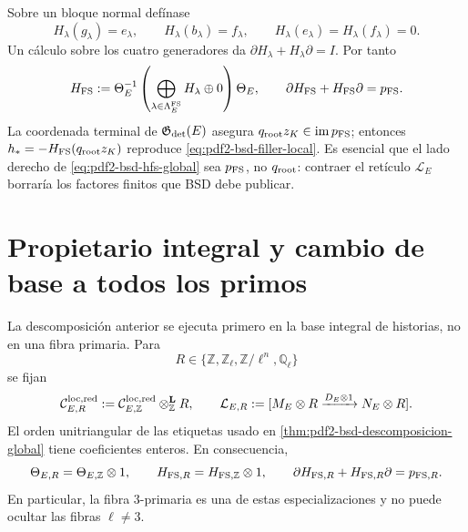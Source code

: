 Sobre un bloque normal defínase
\begin{equation}\label{eq:pdf2-bsd-hfs-generadores}
 H_\lambda(g_\lambda)=e_\lambda,
 \qquad H_\lambda(b_\lambda)=f_\lambda,
 \qquad H_\lambda(e_\lambda)=H_\lambda(f_\lambda)=0.
\end{equation}
Un cálculo sobre los cuatro generadores da
$\partial H_\lambda+H_\lambda\partial=I$. Por tanto
\begin{equation}\label{eq:pdf2-bsd-hfs-global}
 H_{\rm FS}:=\Theta_E^{-1}
 \left(\bigoplus_{\lambda\in\Lambda_E^{\rm FS}}H_\lambda\oplus0\right)
 \Theta_E,
 \qquad
 \partial H_{\rm FS}+H_{\rm FS}\partial=p_{\rm FS}.
\end{equation}
La coordenada terminal de $\mathfrak G_{\rm det}(E)$ asegura
$q_{\rm root}z_K\in\operatorname{im}p_{\rm FS}$; entonces
$h_*=-H_{\rm FS}(q_{\rm root}z_K)$ reproduce
\eqref{eq:pdf2-bsd-filler-local}. Es esencial que el lado derecho de
\eqref{eq:pdf2-bsd-hfs-global} sea $p_{\rm FS}$, no $q_{\rm root}$:
contraer el retículo $\mathcal L_E$ borraría los factores finitos que BSD
debe publicar.

\section{Propietario integral y cambio de base a todos los primos}

La descomposición anterior se ejecuta primero en la base integral de
historias, no en una fibra primaria. Para
\[
 R\in\{\mathbb Z,\mathbb Z_\ell,\mathbb Z/\ell^n,
          \mathbb Q_\ell\}
\]
se fijan
\begin{equation}\label{eq:pdf2-bsd-complejos-base-change}
 \mathcal C_{E,R}^{\rm loc,red}:=
 \mathcal C_{E,\mathbb Z}^{\rm loc,red}
       \otimes_{\mathbb Z}^{\mathbf L}R,
 \qquad
 \mathcal L_{E,R}:=
 [M_E\otimes R\xrightarrow{D_E\otimes1}N_E\otimes R].
\end{equation}
El orden unitriangular de las etiquetas usado en
\cref{thm:pdf2-bsd-descomposicion-global} tiene coeficientes enteros. En
consecuencia,
\begin{equation}\label{eq:pdf2-bsd-theta-base-change}
 \Theta_{E,R}=\Theta_{E,\mathbb Z}\otimes1,
 \qquad
 H_{{\rm FS},R}=H_{{\rm FS},\mathbb Z}\otimes1,
 \qquad
 \partial H_{{\rm FS},R}+H_{{\rm FS},R}\partial=p_{{\rm FS},R}.
\end{equation}
En particular, la fibra $3$-primaria es una de estas especializaciones y no
puede ocultar las fibras $\ell\ne3$.

